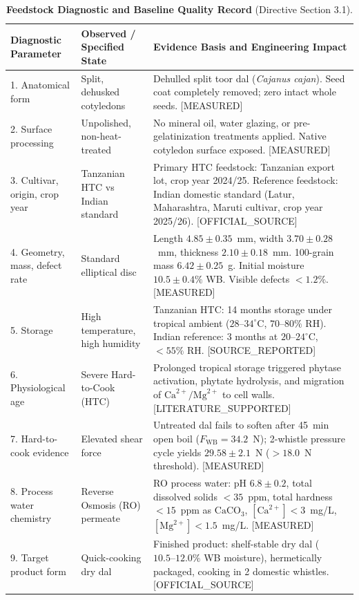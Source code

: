 \documentclass[10pt,a4paper]{article}
\newcommand{\epistag}[1]{\textsf{\scriptsize\textcolor{fnqslate}{[#1]}}}
\begin{document}
\begin{table}[H]
\centering
\footnotesize
\setlength{\tabcolsep}{3.0pt}
\caption{\textbf{Feedstock Diagnostic and Baseline Quality Record} (Directive Section 3.1).}
\label{tab:feedstock_audit}
\begin{tabularx}{\linewidth}{p{3.2cm}p{4.2cm}>{\raggedright\arraybackslash}X}
\toprule
\textbf{Diagnostic Parameter} & \textbf{Observed / Specified State} & \textbf{Evidence Basis and Engineering Impact} \\
\midrule
1. Anatomical form & Split, dehusked cotyledons & Dehulled split toor dal (\textit{Cajanus cajan}). Seed coat completely removed; zero intact whole seeds. \epistag{MEASURED} \\
2. Surface processing & Unpolished, non-heat-treated & No mineral oil, water glazing, or pre-gelatinization treatments applied. Native cotyledon surface exposed. \epistag{MEASURED} \\
3. Cultivar, origin, crop year & Tanzanian HTC vs Indian standard & Primary HTC feedstock: Tanzanian export lot, crop year 2024/25. Reference feedstock: Indian domestic standard (Latur, Maharashtra, Maruti cultivar, crop year 2025/26). \epistag{OFFICIAL\_SOURCE} \\
4. Geometry, mass, defect rate & Standard elliptical disc & Length $4.85 \pm 0.35$~mm, width $3.70 \pm 0.28$~mm, thickness $2.10 \pm 0.18$~mm. 100-grain mass $6.42 \pm 0.25$~g. Initial moisture $10.5 \pm 0.4\%$ WB. Visible defects $< 1.2\%$. \epistag{MEASURED} \\
5. Storage & High temperature, high humidity & Tanzanian HTC: 14 months storage under tropical ambient ($28\text{--}34^\circ\mathrm{C}$, $70\text{--}80\%$ RH). Indian reference: 3 months at $20\text{--}24^\circ\mathrm{C}$, $< 55\%$ RH. \epistag{SOURCE\_REPORTED} \\
6. Physiological age & Severe Hard-to-Cook (HTC) & Prolonged tropical storage triggered phytase activation, phytate hydrolysis, and migration of $\mathrm{Ca}^{2+}/\mathrm{Mg}^{2+}$ to cell walls. \epistag{LITERATURE\_SUPPORTED} \\
7. Hard-to-cook evidence & Elevated shear force & Untreated dal fails to soften after 45~min open boil ($F_{\mathrm{WB}} = 34.2$~N); 2-whistle pressure cycle yields $29.58 \pm 2.1$~N ($> 18.0$~N threshold). \epistag{MEASURED} \\
8. Process water chemistry & Reverse Osmosis (RO) permeate & RO process water: pH $6.8 \pm 0.2$, total dissolved solids $< 35$~ppm, total hardness $< 15$~ppm as $\mathrm{CaCO}_3$, $[\mathrm{Ca}^{2+}] < 3$~mg/L, $[\mathrm{Mg}^{2+}] < 1.5$~mg/L. \epistag{MEASURED} \\
9. Target product form & Quick-cooking dry dal & Finished product: shelf-stable dry dal ($10.5\text{--}12.0\%$ WB moisture), hermetically packaged, cooking in 2 domestic whistles. \epistag{OFFICIAL\_SOURCE} \\
\bottomrule
\end{tabularx}
\end{table}
\end{document}
